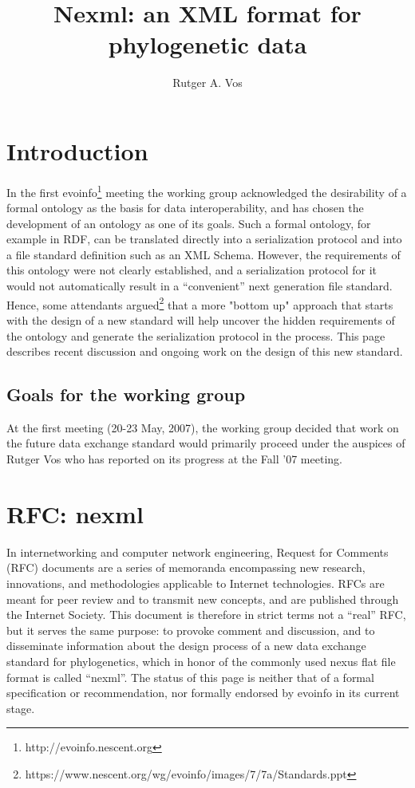 \documentclass{article}
\author{Rutger A. Vos}
\title{Nexml: an XML format for phylogenetic data}
\begin{document}
\maketitle
\tableofcontents

\section{Introduction}
In the first evoinfo\footnote{http://evoinfo.nescent.org} meeting the working group acknowledged the desirability of a formal 
ontology as the basis for data interoperability, and has chosen the development of an ontology 
as one of its goals. Such a formal ontology, for example in RDF, can be translated directly into a 
serialization protocol and into a file standard definition such as an XML Schema. However, the requirements 
of this ontology were not clearly established, and a serialization protocol for it would not automatically 
result in a ``convenient'' next generation file standard. Hence, some attendants argued\footnote{https://www.nescent.org/wg/evoinfo/images/7/7a/Standards.ppt} that a more "bottom up" approach that 
starts with the design of a new standard will help uncover the hidden requirements of the ontology and generate 
the serialization protocol in the process. This page describes recent discussion and ongoing work on the 
design of this new standard.

\subsection{Goals for the working group}
At the first meeting (20-23 May, 2007), the working group decided that work on the future data exchange 
standard would primarily proceed under the auspices of Rutger Vos who has  
reported on its progress at the Fall '07 meeting.

\section{RFC: nexml}
In internetworking and computer network engineering, Request for Comments (RFC) documents are a series of 
memoranda encompassing new research, innovations, and methodologies applicable to Internet technologies. 
RFCs are meant for peer review and to transmit new concepts, and are published through the Internet Society. 
This document is therefore in strict terms not a ``real'' RFC, but it serves the same purpose: to provoke 
comment and discussion, and to disseminate information about the design process of a new data exchange 
standard for phylogenetics, which in honor of the commonly used nexus flat file format is called ``nexml''. 
The status of this page is neither that of a formal specification or recommendation, nor formally endorsed 
by evoinfo in its current stage.
\end{document}
